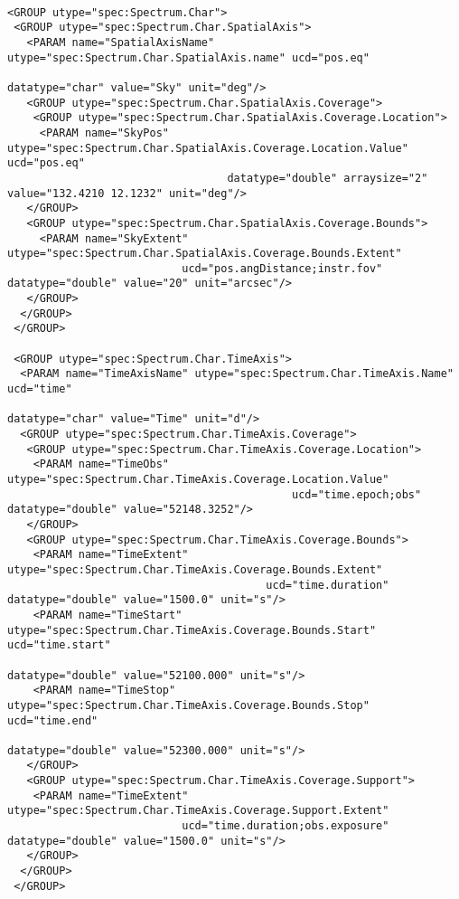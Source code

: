 {\begin{flushleft}
\begin{fmpage}
\begin{verbatim}

<GROUP utype="spec:Spectrum.Char">
 <GROUP utype="spec:Spectrum.Char.SpatialAxis">
   <PARAM name="SpatialAxisName" utype="spec:Spectrum.Char.SpatialAxis.name" ucd="pos.eq" 
                                                               datatype="char" value="Sky" unit="deg"/>
   <GROUP utype="spec:Spectrum.Char.SpatialAxis.Coverage">
    <GROUP utype="spec:Spectrum.Char.SpatialAxis.Coverage.Location">
     <PARAM name="SkyPos" utype="spec:Spectrum.Char.SpatialAxis.Coverage.Location.Value" ucd="pos.eq" 
                                  datatype="double" arraysize="2" value="132.4210 12.1232" unit="deg"/>
   </GROUP>
   <GROUP utype="spec:Spectrum.Char.SpatialAxis.Coverage.Bounds">
     <PARAM name="SkyExtent" utype="spec:Spectrum.Char.SpatialAxis.Coverage.Bounds.Extent" 
                           ucd="pos.angDistance;instr.fov" datatype="double" value="20" unit="arcsec"/>
   </GROUP>
  </GROUP>
 </GROUP>

 <GROUP utype="spec:Spectrum.Char.TimeAxis">
  <PARAM name="TimeAxisName" utype="spec:Spectrum.Char.TimeAxis.Name" ucd="time" 
                                                                datatype="char" value="Time" unit="d"/>
  <GROUP utype="spec:Spectrum.Char.TimeAxis.Coverage">
   <GROUP utype="spec:Spectrum.Char.TimeAxis.Coverage.Location">
    <PARAM name="TimeObs" utype="spec:Spectrum.Char.TimeAxis.Coverage.Location.Value" 
                                            ucd="time.epoch;obs" datatype="double" value="52148.3252"/>
   </GROUP>
   <GROUP utype="spec:Spectrum.Char.TimeAxis.Coverage.Bounds">
    <PARAM name="TimeExtent" utype="spec:Spectrum.Char.TimeAxis.Coverage.Bounds.Extent" 
                                        ucd="time.duration" datatype="double" value="1500.0" unit="s"/>
    <PARAM name="TimeStart" utype="spec:Spectrum.Char.TimeAxis.Coverage.Bounds.Start" ucd="time.start"
                                                         datatype="double" value="52100.000" unit="s"/>
    <PARAM name="TimeStop" utype="spec:Spectrum.Char.TimeAxis.Coverage.Bounds.Stop" ucd="time.end"
                                                         datatype="double" value="52300.000" unit="s"/>
   </GROUP>
   <GROUP utype="spec:Spectrum.Char.TimeAxis.Coverage.Support">
    <PARAM name="TimeExtent" utype="spec:Spectrum.Char.TimeAxis.Coverage.Support.Extent" 
                           ucd="time.duration;obs.exposure" datatype="double" value="1500.0" unit="s"/>
   </GROUP>
  </GROUP>
 </GROUP>


\end{verbatim}
\end{fmpage}
\end{flushleft}}
